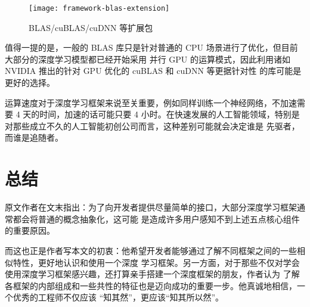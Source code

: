 \begin{figure}[hbtp]
\centering
\texttt{[image: framework-blas-extension]}
\caption{BLAS/cuBLAS/cuDNN 等扩展包}
\label{fig:framework-blas-extension}
\end{figure}

值得一提的是，一般的 BLAS 库只是针对普通的 CPU 场景进行了优化，但目前大部分的深度学习模型都已经开始采用
并行 GPU 的运算模式，因此利用诸如 NVIDIA 推出的针对 GPU 优化的 cuBLAS 和 cuDNN 等更据针对性
的库可能是更好的选择。

运算速度对于深度学习框架来说至关重要，例如同样训练一个神经网络，不加速需要 4 天的时间，加速的话可能只要
4 小时。在快速发展的人工智能领域，特别是对那些成立不久的人工智能初创公司而言，这种差别可能就会决定谁是
先驱者，而谁是追随者。


\section{总结}\label{sec:framework-conclusion}

原文作者在文末指出：为了向开发者提供尽量简单的接口，大部分深度学习框架通常都会将普通的概念抽象化，这可能
是造成许多用户感知不到上述五点核心组件的重要原因。

而这也正是作者写本文的初衷：他希望开发者能够通过了解不同框架之间的一些相似特性，更好地认识和使用一个深度
学习框架。另一方面，对于那些不仅对学会使用深度学习框架感兴趣，还打算亲手搭建一个深度框架的朋友，作者认为
了解各框架的内部组成和一些共性的特征也是迈向成功的重要一步。他真诚地相信，一个优秀的工程师不仅应该
“知其然”，更应该“知其所以然”。


\endinput